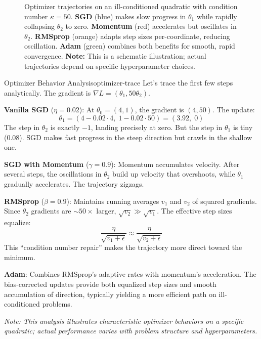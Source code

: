 \documentclass[../../main.tex]{subfiles}
\begin{document}
\begin{figure}[htbp]
\caption{Optimizer trajectories on an ill-conditioned quadratic with condition number $\kappa=50$. \textbf{SGD} (blue) makes slow progress in $\theta_1$ while rapidly collapsing $\theta_2$ to zero. \textbf{Momentum} (red) accelerates but oscillates in $\theta_2$. \textbf{RMSprop} (orange) adapts step sizes per-coordinate, reducing oscillation. \textbf{Adam} (green) combines both benefits for smooth, rapid convergence. \textbf{Note:} This is a schematic illustration; actual trajectories depend on specific hyperparameter choices.}
\label{fig:optimizer-comparison}
\end{figure}

\begin{example}{Optimizer Behavior Analysis}{optimizer-trace}
Let's trace the first few steps analytically. The gradient is $\nabla L = (\theta_1, 50\theta_2)$.

\textbf{Vanilla SGD} ($\eta = 0.02$): At $\theta_0 = (4, 1)$, the gradient is $(4, 50)$. The update:
\[
\theta_1 = (4 - 0.02 \cdot 4,\; 1 - 0.02 \cdot 50) = (3.92,\; 0)
\]
The step in $\theta_2$ is exactly $-1$, landing precisely at zero. But the step in $\theta_1$ is tiny (0.08). SGD makes fast progress in the steep direction but crawls in the shallow one.

\textbf{SGD with Momentum} ($\gamma = 0.9$): Momentum accumulates velocity. After several steps, the oscillations in $\theta_2$ build up velocity that overshoots, while $\theta_1$ gradually accelerates. The trajectory zigzags.

\textbf{RMSprop} ($\beta = 0.9$): Maintains running averages $v_1$ and $v_2$ of squared gradients. Since $\theta_2$ gradients are $\sim 50\times$ larger, $\sqrt{v_2} \gg \sqrt{v_1}$. The effective step sizes equalize:
\[
\frac{\eta}{\sqrt{v_1 + \epsilon}} \approx \frac{\eta}{\sqrt{v_2 + \epsilon}}
\]
This ``condition number repair'' makes the trajectory more direct toward the minimum.

\textbf{Adam}: Combines RMSprop's adaptive rates with momentum's acceleration. The bias-corrected updates provide both equalized step sizes and smooth accumulation of direction, typically yielding a more efficient path on ill-conditioned problems.

\textit{Note: This analysis illustrates characteristic optimizer behaviors on a specific quadratic; actual performance varies with problem structure and hyperparameters.}
\end{example}
\end{document}
